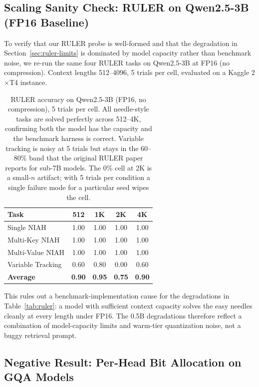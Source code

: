 \documentclass[11pt,a4paper]{article}
\begin{document}
\subsection{Scaling Sanity Check: RULER on Qwen2.5-3B (FP16 Baseline)}
\label{sec:ruler-3b}

To verify that our RULER probe is well-formed and that the degradation in Section~\ref{sec:ruler-limits} is dominated by model capacity rather than benchmark noise, we re-run the same four RULER tasks on Qwen2.5-3B at FP16 (no compression). Context lengths 512--4096, 5 trials per cell, evaluated on a Kaggle 2$\times$T4 instance.

\begin{table}[h]
\centering
\small
\begin{tabular}{lcccc}
\toprule
\textbf{Task} & \textbf{512} & \textbf{1K} & \textbf{2K} & \textbf{4K} \\
\midrule
Single NIAH         & 1.00 & 1.00 & 1.00 & 1.00 \\
Multi-Key NIAH      & 1.00 & 1.00 & 1.00 & 1.00 \\
Multi-Value NIAH    & 1.00 & 1.00 & 1.00 & 1.00 \\
Variable Tracking   & 0.60 & 0.80 & 0.00 & 0.60 \\
\midrule
\textbf{Average}    & \textbf{0.90} & \textbf{0.95} & \textbf{0.75} & \textbf{0.90} \\
\bottomrule
\end{tabular}
\caption{RULER accuracy on Qwen2.5-3B (FP16, no compression), 5 trials per cell. All needle-style tasks are solved perfectly across 512--4K, confirming both the model has the capacity and the benchmark harness is correct. Variable tracking is noisy at 5 trials but stays in the 60--80\% band that the original RULER paper reports for sub-7B models. The 0\% cell at 2K is a small-$n$ artifact; with 5 trials per condition a single failure mode for a particular seed wipes the cell.}
\label{tab:ruler-3b-fp16}
\end{table}

This rules out a benchmark-implementation cause for the degradations in Table~\ref{tab:ruler}: a model with sufficient context capacity solves the easy needles cleanly at every length under FP16. The 0.5B degradations therefore reflect a combination of model-capacity limits and warm-tier quantization noise, not a buggy retrieval prompt.

\subsection{Negative Result: Per-Head Bit Allocation on GQA Models}
\label{sec:per-head-ablation}
\end{document}

